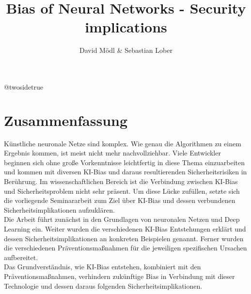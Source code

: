 \documentclass[12pt,oneside,a4paper,parskip]{scrbook}
\makeatletter
\def\BaAuthorStudyProgram{Informatik} %
\def\BaType{Seminararbeit} %
\def\BaTitle{Bias of Neural Networks - Security implications}
\def\BaSupervisorOne{Prof.\ Dr.\ A B}
\def\BaSupervisorTwo{Prof.\ Dr.\ C D}
\def\BaDeadline{\today}
\newcommand*{\forcetwosidetitle}[1][1]{%
 \begingroup
   \cleardoubleoddpage
   \KOMAoptions{titlepage=true}%
   \csname @twosidetrue\endcsname
   \maketitle[{#1}]
 \endgroup
}
\makeatother
\begin{document}


\frontmatter
\titlehead{%
  {Hochschule für angewandte Wissenschaften Würzburg-Schweinfurt\\
   Fakultät Informatik und Wirtschaftsinformatik}}
\subject{\BaType}
\title{\BaTitle\\[15mm]}
\author{David Mödl \& Sebastian Lober}
\forcetwosidetitle



\section*{Zusammenfassung}
Künstliche neuronale Netze sind komplex. Wie genau die Algorithmen zu einem Ergebnis kommen, ist meist nicht mehr nachvollziehbar. Viele Entwickler beginnen  sich ohne große Vorkenntnisse leichtfertig in diese Thema einzuarbeiten und kommen mit diversen KI-Bias und daraus resultierenden Sicherheitsrisiken in Berührung. Im wissenschaftlichen Bereich ist die Verbindung zwischen KI-Bias und Sicherheitsproblem nicht sehr präsent. Um diese Lücke zufüllen, setzte sich die vorliegende Seminararbeit zum Ziel über KI-Bias und dessen verbundenen Sicherheitsimplikationen aufzuklären.\\
Die Arbeit führt zunächst in den Grundlagen von neuronalen Netzen und Deep Learning ein. Weiter wurden die verschiedenen KI-Bias Entstehungen erklärt und dessen Sicherheitsimplikationen an konkreten Beispielen genannt. Ferner wurden die verschiedenen Präventionsmaßnahmen für die jeweiligen spezifischen Ursachen aufbereitet.\\
Das Grundverständnis, wie KI-Bias entstehen, kombiniert mit den Präventionsmaßnahmen, verhindern zukünftige Bias in Verbindung mit dieser Technologie und dessen daraus folgenden Sicherheitsimplikationen.
\tableofcontents
\end{document}
